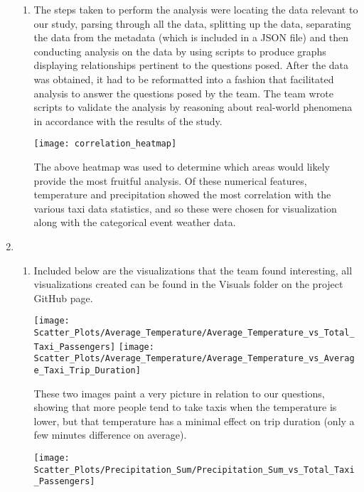 \documentclass{article}
\begin{document}
\begin{enumerate}
\begin{enumerate}
        \item %

        The steps taken to perform the analysis were locating the data relevant to our study, parsing through all the data, splitting up the data, separating the data from the metadata (which is included in a JSON file) and then conducting analysis on the data by using scripts to produce graphs displaying relationships pertinent to the questions posed. After the data was obtained, it had to be reformatted into a fashion that facilitated analysis to answer the questions posed by the team. The team wrote scripts to validate the analysis by reasoning about real-world phenomena in accordance with the results of the study.
        
        \begin{center}
            \texttt{[image: correlation\_heatmap]}
        \end{center}
        
        The above heatmap was used to determine which areas would likely provide the most fruitful analysis. Of these numerical features, temperature and precipitation showed the most correlation with the various taxi data statistics, and so these were chosen for visualization along with the categorical event weather data.

    \end{enumerate}

    \item %
    \begin{enumerate}

        \item %

        Included below are the visualizations that the team found interesting, all visualizations created can be found in the Visuals folder on the project GitHub page.

        \texttt{[image: Scatter\_Plots/Average\_Temperature/Average\_Temperature\_vs\_Total\_Taxi\_Passengers]}
        \texttt{[image: Scatter\_Plots/Average\_Temperature/Average\_Temperature\_vs\_Average\_Taxi\_Trip\_Duration]}

        These two images paint a very picture in relation to our questions, showing that more people tend to take taxis when the temperature is lower, but that temperature has a minimal effect on trip duration (only a few minutes difference on average).

        \begin{center}
            \texttt{[image: Scatter\_Plots/Precipitation\_Sum/Precipitation\_Sum\_vs\_Total\_Taxi\_Passengers]}
        \end{center}


\end{enumerate}
\end{enumerate}
\end{document}
